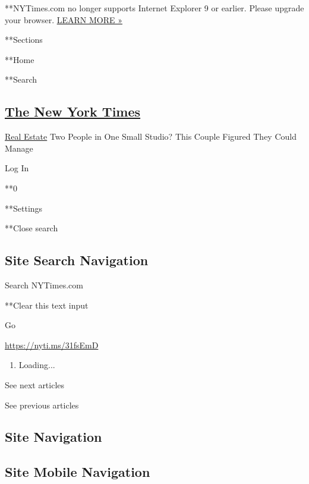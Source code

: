  **NYTimes.com no longer supports Internet Explorer 9 or earlier. Please
upgrade your browser.
\href{http://www.nytimes3xbfgragh.onion/content/help/site/ie9-support.html}{LEARN
MORE »}

**Sections

**Home

**Search

\hypertarget{the-new-york-times}{%
\subsection{\texorpdfstring{\href{http://www.nytimes3xbfgragh.onion/}{The
New York Times}}{The New York Times}}\label{the-new-york-times}}

 \href{https://www.nytimes3xbfgragh.onion/section/realestate}{Real
Estate} \textbar{}Two People in One Small Studio? This Couple Figured
They Could Manage

Log In

**0

**Settings

**Close search

\hypertarget{site-search-navigation}{%
\subsection{Site Search Navigation}\label{site-search-navigation}}

Search NYTimes.com

**Clear this text input

Go

\url{https://nyti.ms/31fsEmD}

\begin{enumerate}
\def\labelenumi{\arabic{enumi}.}
\item
  Loading...
\end{enumerate}

See next articles

See previous articles

\hypertarget{site-navigation}{%
\subsection{Site Navigation}\label{site-navigation}}

\hypertarget{site-mobile-navigation}{%
\subsection{Site Mobile Navigation}\label{site-mobile-navigation}}

